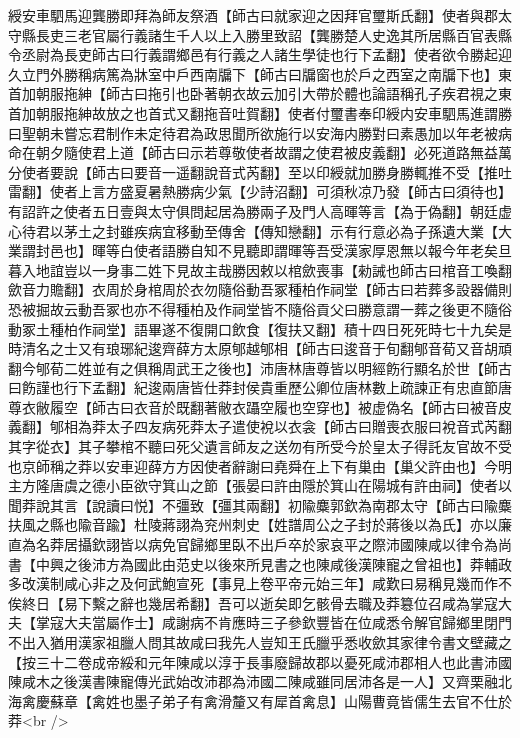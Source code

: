 綬安車駟馬迎龔勝即拜為師友祭酒【師古曰就家迎之因拜官璽斯氏翻】使者與郡太守縣長吏三老官屬行義諸生千人以上入勝里致詔【龔勝楚人史逸其所居縣百官表縣令丞尉為長吏師古曰行義謂鄉邑有行義之人諸生學徒也行下孟翻】使者欲令勝起迎久立門外勝稱病篤為牀室中戶西南牖下【師古曰牖窗也於戶之西室之南牖下也】東首加朝服拖紳【師古曰拖引也卧著朝衣故云加引大帶於體也論語稱孔子疾君視之東首加朝服拖紳故放之也首式又翻拖音吐賀翻】使者付璽書奉印綬内安車駟馬進謂勝曰聖朝未嘗忘君制作未定待君為政思聞所欲施行以安海内勝對曰素愚加以年老被病命在朝夕隨使君上道【師古曰示若尊敬使者故謂之使君被皮義翻】必死道路無益萬分使者要說【師古曰要音一遥翻說音式芮翻】至以印綬就加勝身勝輒推不受【推吐雷翻】使者上言方盛夏暑熱勝病少氣【少詩沼翻】可須秋凉乃發【師古曰須待也】有詔許之使者五日壹與太守俱問起居為勝兩子及門人高暉等言【為于偽翻】朝廷虚心待君以茅土之封雖疾病宜移動至傳舍【傳知戀翻】示有行意必為子孫遺大業【大業謂封邑也】暉等白使者語勝自知不見聽即謂暉等吾受漢家厚恩無以報今年老矣旦暮入地誼豈以一身事二姓下見故主哉勝因敕以棺歛喪事【勑誡也師古曰棺音工喚翻歛音力贍翻】衣周於身棺周於衣勿隨俗動吾冢種柏作祠堂【師古曰若葬多設器備則恐被掘故云動吾冢也亦不得種柏及作祠堂皆不隨俗貢父曰勝意謂一葬之後更不隨俗動冢土種柏作祠堂】語畢遂不復開口飲食【復扶又翻】積十四日死死時七十九矣是時清名之士又有琅琊紀逡齊薛方太原郇越郇相【師古曰逡音于旬翻郇音荀又音胡頑翻今郇荀二姓並有之俱稱周武王之後也】沛唐林唐尊皆以明經飭行顯名於世【師古曰飭謹也行下孟翻】紀逡兩唐皆仕莽封侯貴重歷公卿位唐林數上疏諫正有忠直節唐尊衣敝履空【師古曰衣音於既翻著敝衣躡空履也空穿也】被虚偽名【師古曰被音皮義翻】郇相為莽太子四友病死莽太子遣使裞以衣衾【師古曰贈喪衣服曰裞音式芮翻其字從衣】其子攀棺不聽曰死父遺言師友之送勿有所受今於皇太子得託友官故不受也京師稱之莽以安車迎薛方方因使者辭謝曰堯舜在上下有巢由【巢父許由也】今明主方隆唐虞之德小臣欲守箕山之節【張晏曰許由隱於箕山在陽城有許由祠】使者以聞莽說其言【說讀曰悦】不彊致【彊其兩翻】初隃麋郭欽為南郡太守【師古曰隃麋扶風之縣也隃音踰】杜陵蔣詡為兖州刺史【姓譜周公之子封於蔣後以為氏】亦以廉直為名莽居攝欽詡皆以病免官歸鄉里臥不出戶卒於家哀平之際沛國陳咸以律令為尚書【中興之後沛方為國此由范史以後來所見書之也陳咸後漢陳寵之曾祖也】莽輔政多改漢制咸心非之及何武鮑宣死【事見上卷平帝元始三年】咸歎曰易稱見幾而作不俟終日【易下繫之辭也幾居希翻】吾可以逝矣即乞骸骨去職及莽簒位召咸為掌寇大夫【掌寇大夫當屬作士】咸謝病不肯應時三子參欽豐皆在位咸悉令解官歸鄉里閉門不出入猶用漢家祖臘人問其故咸曰我先人豈知王氏臘乎悉收歛其家律令書文壁藏之【按三十二卷成帝綏和元年陳咸以淳于長事廢歸故郡以憂死咸沛郡相人也此書沛國陳咸木之後漢書陳寵傳光武始改沛郡為沛國二陳咸雖同居沛各是一人】又齊栗融北海禽慶蘇章【禽姓也墨子弟子有禽滑釐又有犀首禽息】山陽曹竟皆儒生去官不仕於莽<br />
